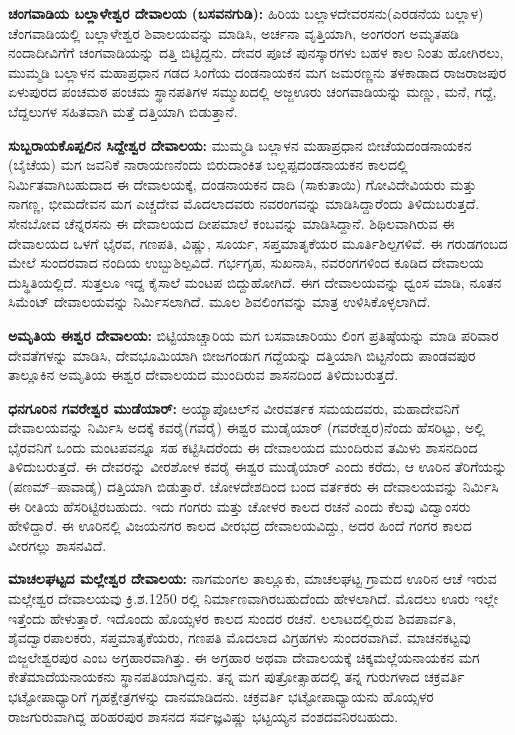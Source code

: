 \textbf{ಚಂಗವಾಡಿಯ ಬಲ್ಲಾಳೇಶ್ವರ ದೇವಾಲಯ (ಬಸವನಗುಡಿ):} ಹಿರಿಯ ಬಲ್ಲಾಳದೇವರಸನು(ಎರಡನೆಯ ಬಲ್ಲಾಳ) ಚೆಂಗವಾಡಿಯಲ್ಲಿ ಬಲ್ಲಾಳೇಶ್ವರ ಶಿವಾಲಯವನ್ನು ಮಾಡಿಸಿ, ಅರ್ಚನಾ ವೃತ್ತಿಯಾಗಿ, ಅಂಗರಂಗ ಅಮೃತಪಡಿ ನಂದಾದೀವಿಗೆಗೆ ಚಂಗವಾಡಿಯನ್ನು ದತ್ತಿ ಬಿಟ್ಟಿದ್ದನು. ದೇವರ ಪೂಜೆ ಪುನಸ್ಕಾರಗಳು ಬಹಳ ಕಾಲ ನಿಂತು ಹೋಗಿರಲು, ಮುಮ್ಮಡಿ ಬಲ್ಲಾಳನ ಮಹಾಪ್ರಧಾನ ಗಡದ ಸಿಂಗೆಯ ದಂಡನಾಯಕನ ಮಗ ಜಮರಣ್ಣನು ತಳಕಾಡಾದ ರಾಜರಾಜಪುರ ಏಳುಪುರದ ಪಂಚಮಠ ಪಂಚಮ ಸ್ಥಾನಪತಿಗಳ ಸಮ್ಮುಖದಲ್ಲಿ ಅಜ್ಜಊರು ಚಂಗವಾಡಿಯನ್ನು ಮಣ್ಣು, ಮನೆ, ಗದ್ದೆ, ಬೆದ್ದಲುಗಳ ಸಹಿತವಾಗಿ ಮತ್ತೆ ದತ್ತಿಯಾಗಿ ಬಿಡುತ್ತಾನೆ.

\textbf{ಸುಬ್ಬರಾಯಕೊಪ್ಪಲಿನ ಸಿದ್ದೇಶ್ವರ ದೇವಾಲಯ: }ಮುಮ್ಮಡಿ ಬಲ್ಲಾಳನ ಮಹಾಪ್ರಧಾನ ಬೀಚೆಯದಂಡನಾಯಕನ (ಬೈಚೆಯ) ಮಗ ಜವನಿಕೆ ನಾರಾಯಣನೆಂದು ಬಿರುದಾಂಕಿತ ಬಲ್ಲಪ್ಪದಂಡನಾಯಕನ ಕಾಲದಲ್ಲಿ ನಿರ್ಮಿತವಾಗಿಬಹುದಾದ ಈ ದೇವಾಲಯಕ್ಕೆ, ದಂಡನಾಯಕನ ದಾದಿ (ಸಾಕುತಾಯಿ) ಗೋವಿದೇವಿಯರು ಮತ್ತು ನಾಗಣ್ಣ, ಭೀಮದೇವನ ಮಗ ಎಚ್ಚದೇವ ಮೊದಲಾದವರು ನವರಂಗವನ್ನು ಮಾಡಿಸಿದ್ದಾರೆಂದು ತಿಳಿದುಬರುತ್ತದೆ. ಸೇನಬೋವ ಚೆನ್ನರಸನು ಈ ದೇವಾಲಯದ ದೀಪಮಾಲೆ ಕಂಬವನ್ನು ಮಾಡಿಸಿದ್ದಾನೆ. ಶಿಥಿಲವಾಗಿರುವ ಈ ದೇವಾಲಯದ ಒಳಗೆ ಭೈರವ, ಗಣಪತಿ, ವಿಷ್ಣು, ಸೂರ್ಯ, ಸಪ್ತಮಾತೃಕೆಯರ ಮೂರ್ತಿಶಿಲ್ಪಗಳಿವೆ. ಈ ಗರುಡಗಂಬದ ಮೇಲೆ ಸುಂದರವಾದ ನಂದಿಯ ಉಬ್ಬುಶಿಲ್ಪವಿದೆ. ಗರ್ಭಗೃಹ, ಸುಖನಾಸಿ, ನವರಂಗಗಳಿಂದ ಕೂಡಿದ ದೇವಾಲಯ ದುಸ್ಥಿತಿಯಲ್ಲಿದೆ. ಸುತ್ತಲೂ ಇದ್ದ ಕೈಸಾಲೆ ಮಂಟಪ ಬಿದ್ದುಹೋಗಿದೆ. ಈಗ ದೇವಾಲಯವನ್ನು ಧ್ವಂಸ ಮಾಡಿ, ನೂತನ ಸಿಮೆಂಟ್​ ದೇವಾಲಯವನ್ನು ನಿರ್ಮಿಸಲಾಗಿದೆ. ಮೂಲ ಶಿವಲಿಂಗವನ್ನು ಮಾತ್ರ ಉಳಿಸಿಕೊಳ್ಳಲಾಗಿದೆ.

\textbf{ಅಮೃತಿಯ ಈಶ್ವರ ದೇವಾಲಯ:} ಬಿಟ್ಟಿಯಾಚ್ಚಾರಿಯ ಮಗ ಬಸವಾಚಾರಿಯು ಲಿಂಗ ಪ್ರತಿಷ್ಠೆಯನ್ನು ಮಾಡಿ ಪರಿವಾರ ದೇವತೆಗಳನ್ನು ಮಾಡಿಸಿ, ದೇವಭೂಮಿಯಾಗಿ ಬೀಜಗಂಡುಗ ಗದ್ದೆಯನ್ನು ದತ್ತಿಯಾಗಿ ಬಿಟ್ಟನೆಂದು ಪಾಂಡವಪುರ ತಾಲ್ಲೂಕಿನ ಅಮೃತಿಯ ಈಶ್ವರ ದೇವಾಲಯದ ಮುಂದಿರುವ ಶಾಸನದಿಂದ ತಿಳಿದುಬರುತ್ತದೆ.

\textbf{ಧನಗೂರಿನ ಗವರೇಶ್ವರ ಮುಡೆಯಾರ್​:} ಅಯ್ಯಾಪೊೞಲ್​ನ ವೀರವರ್ತಕ ಸಮಯದವರು, ಮಹಾದೇವನಿಗೆ ದೇವಾಲಯವನ್ನು ನಿರ್ಮಿಸಿ ಅದಕ್ಕೆ ಕವರೈ(ಗವರೈ) ಈಶ್ವರ ಮುಡೈಯಾರ್​ (ಗವರೇಶ್ವರ)ನೆಂದು ಹೆಸರಿಟ್ಟು, ಅಲ್ಲಿ ಭೈರವನಿಗೆ ಒಂದು ಮಂಟಪವನ್ನೂ ಸಹ ಕಟ್ಟಿಸಿದರೆಂದು ಈ ದೇವಾಲಯದ ಮುಂದಿರುವ ತಮಿಳು ಶಾಸನದಿಂದ ತಿಳಿದುಬರುತ್ತದೆ. ಈ ದೇವರನ್ನು ವೀರಶೋಳ ಕವರೈ ಈಶ್ವರ ಮುಡೈಯಾರ್​ ಎಂದು ಕರೆದು, ಆ ಊರಿನ ತೆರಿಗೆಯನ್ನು (ಪಣಮ್–ಪಾವಾಡೈ) ದತ್ತಿಯಾಗಿ ಬಿಡುತ್ತಾರೆ. ಚೋಳದೇಶದಿಂದ ಬಂದ ವರ್ತಕರು ಈ ದೇವಾಲಯವನ್ನು ನಿರ್ಮಿಸಿ ಈ ರೀತಿಯ ಹೆಸರಿಟ್ಟಿರಬಹುದು. ಇದು ಗಂಗರು ಮತ್ತು ಚೋಳರ ಕಾಲದ ರಚನೆ ಎಂದು ಕೆಲವು ವಿದ್ವಾಂಸರು ಹೇಳಿದ್ದಾರೆ. ಈ ಊರಿನಲ್ಲಿ ವಿಜಯನಗರ ಕಾಲದ ವೀರಭದ್ರ ದೇವಾಲಯವಿದ್ದು, ಅದರ ಹಿಂದೆ ಗಂಗರ ಕಾಲದ ವೀರಗಲ್ಲು ಶಾಸನವಿದೆ. 

\textbf{ಮಾಚಲಘಟ್ಟದ ಮಲ್ಲೇಶ್ವರ ದೇವಾಲಯ:} ನಾಗಮಂಗಲ ತಾಲ್ಲೂಕು, ಮಾಚಲಘಟ್ಟ ಗ್ರಾಮದ ಊರಿನ ಆಚೆ ಇರುವ ಮಲ್ಲೇಶ್ವರ ದೇವಾಲಯವು ಕ್ರಿ.ಶ.1250 ರಲ್ಲಿ ನಿರ್ಮಾಣವಾಗಿರಬಹುದೆಂದು ಹೇಳಲಾಗಿದೆ. ಮೊದಲು ಊರು ಇಲ್ಲೇ ಇತ್ತೆಂದು ಹೇಳುತ್ತಾರೆ. ಇದೊಂದು ಹೊಯ್ಸಳರ ಕಾಲದ ಸುಂದರ ರಚನೆ. ಲಲಾಟದಲ್ಲಿರುವ ಶಿವಪಾರ್ವತಿ, ಶೈವದ್ವಾರಪಾಲಕರು, ಸಪ್ತಮಾತೃಕೆಯರು, ಗಣಪತಿ ಮೊದಲಾದ ವಿಗ್ರಹಗಳು ಸುಂದರವಾಗಿವೆ. ಮಾಚನಕಟ್ಟವು ಬಿಜ್ಜಲೇಶ್ವರಪುರ ಎಂಬ ಅಗ್ರಹಾರವಾಗಿತ್ತು. ಈ ಅಗ್ರಹಾರ ಅಥವಾ ದೇವಾಲಯಕ್ಕೆ ಚಿಕ್ಕಮಲ್ಲೆಯನಾಯಕನ ಮಗ ಕೇತೆಮಾದೆಯನಾಯಕನು ಸ್ಥಾನಪತಿಯಾಗಿದ್ದನು. ತನ್ನ ಮಗ ಪುತ್ರೋತ್ಸಾಹದಲ್ಲಿ ತನ್ನ ಗುರುಗಳಾದ ಚಕ್ರವರ್ತಿ ಭಟ್ಟೋಪಾಧ್ಯಾರಿಗೆ ಗೃಹಕ್ಷೇತ್ರಗಳನ್ನು ದಾನಮಾಡಿದನು. ಚಕ್ರವರ್ತಿ ಭಟ್ಟೋಪಾಧ್ಯಾಯನು ಹೊಯ್ಸಳರ ರಾಜಗುರುವಾಗಿದ್ದ ಹರಿಹರಪುರ ಶಾಸನದ ಸರ್ವಜ್ಞವಿಷ್ಣು ಭಟ್ಟಯ್ಯನ ವಂಶದವನಿರಬಹುದು.

